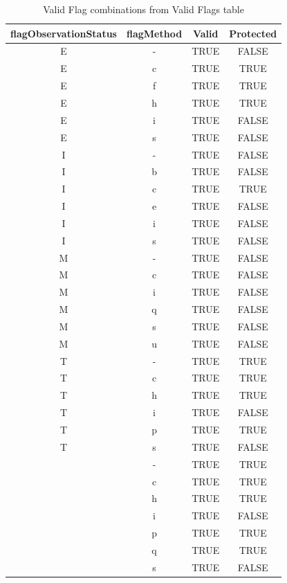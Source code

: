 \documentclass[]{article}
\begin{document}
\begin{table}

\caption{\label{tab:t1}Valid Flag combinations from Valid Flags table}
\centering
\begin{tabular}[t]{c|c|c|c}
\hline
flagObservationStatus & flagMethod & Valid & Protected\\
\hline
E & - & TRUE & FALSE\\
\hline
E & c & TRUE & TRUE\\
\hline
E & f & TRUE & TRUE\\
\hline
E & h & TRUE & TRUE\\
\hline
E & i & TRUE & FALSE\\
\hline
E & s & TRUE & FALSE\\
\hline
I & - & TRUE & FALSE\\
\hline
I & b & TRUE & FALSE\\
\hline
I & c & TRUE & TRUE\\
\hline
I & e & TRUE & FALSE\\
\hline
I & i & TRUE & FALSE\\
\hline
I & s & TRUE & FALSE\\
\hline
M & - & TRUE & FALSE\\
\hline
M & c & TRUE & FALSE\\
\hline
M & i & TRUE & FALSE\\
\hline
M & q & TRUE & FALSE\\
\hline
M & s & TRUE & FALSE\\
\hline
M & u & TRUE & FALSE\\
\hline
T & - & TRUE & TRUE\\
\hline
T & c & TRUE & TRUE\\
\hline
T & h & TRUE & TRUE\\
\hline
T & i & TRUE & FALSE\\
\hline
T & p & TRUE & TRUE\\
\hline
T & s & TRUE & FALSE\\
\hline
 & - & TRUE & TRUE\\
\hline
 & c & TRUE & TRUE\\
\hline
 & h & TRUE & TRUE\\
\hline
 & i & TRUE & FALSE\\
\hline
 & p & TRUE & TRUE\\
\hline
 & q & TRUE & TRUE\\
\hline
 & s & TRUE & FALSE\\
\hline
\end{tabular}
\end{table}
\end{document}
